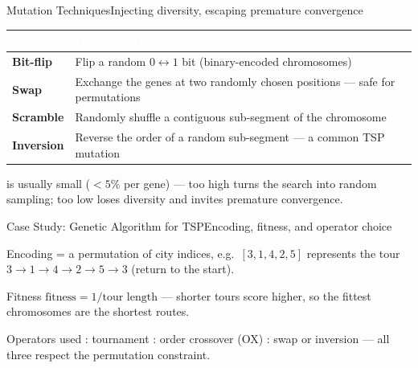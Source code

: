 \documentclass[aspectratio=169,11pt]{beamer}
\begin{document}
\begin{frame}{Mutation Techniques}{Injecting diversity, escaping premature convergence}
  \small
  \renewcommand{\arraystretch}{1.25}
  \begin{center}
  \begin{tabularx}{\textwidth}{@{}>{\bfseries}l >{\raggedright\arraybackslash}X@{}}
    \toprule
    \rowcolor{PrimaryDark}
    \textcolor{white}{Method} & \textcolor{white}{How it works} \\
    \midrule
    Bit-flip & Flip a random $0\leftrightarrow1$ bit (binary-encoded chromosomes) \\
    \rowcolor{PrimaryLight!25}
    Swap & Exchange the genes at two randomly chosen positions — safe for permutations \\
    Scramble & Randomly shuffle a contiguous sub-segment of the chromosome \\
    \rowcolor{PrimaryLight!25}
    Inversion & Reverse the order of a random sub-segment — a common TSP mutation \\
    \bottomrule
  \end{tabularx}
  \end{center}
  \begin{center}\scriptsize
     is usually small ($<5\%$ per gene) — too high turns the search
    into random sampling; too low loses diversity and invites premature convergence.
  \end{center}
\end{frame}

\begin{frame}{Case Study: Genetic Algorithm for TSP}{Encoding, fitness, and operator choice}
  \begin{block}{Encoding}
    \small {} = a permutation of city indices, e.g.\ $[3,1,4,2,5]$ represents
    the tour $3\to1\to4\to2\to5\to3$ (return to the start).
  \end{block}
  \begin{exampleblock}{Fitness}
    \small $\text{fitness} = 1 / \text{tour length}$ — shorter tours score higher, so the
    fittest chromosomes are the shortest routes.
  \end{exampleblock}
  \begin{alertblock}{Operators used}
    \small {}: tournament \quad {}: order crossover (OX)
    \quad {}: swap or inversion — all three respect the permutation constraint.
  \end{alertblock}
\end{frame}
\end{document}
